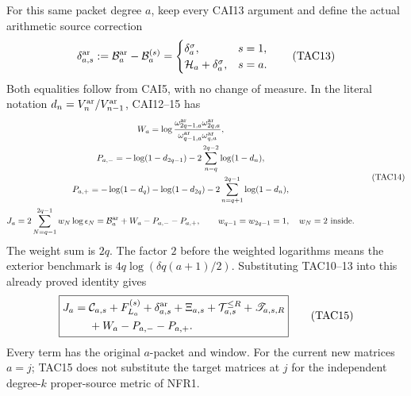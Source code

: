 \documentclass[11pt,a4paper]{article}
\begin{document}
For this same packet degree $a$, keep every CAI13 argument and define
the actual arithmetic source correction
\[
 \delta_{a,s}^{\rm ar}:=\mathcal B_a^{\rm ar}-\mathcal B_a^{(s)}
 =\begin{cases}
     \delta_a^\sigma,&s=1,\\
     \mathcal H_a+\delta_a^\sigma,&s=a.
   \end{cases}
 \tag{TAC13}
\]
Both equalities follow from CAI5, with no change of measure.
In the literal notation $d_n=V_n^{\rm ar}/V_{n-1}^{\rm ar}$,
CAI12--15 has
\[
 \begin{gathered}
 W_a=\log\frac{\omega_{2q-1,a}^{\rm ar}\omega_{2q,a}^{\rm ar}}
                      {\omega_{q-1,a}^{\rm ar}\omega_{q,a}^{\rm ar}},\\
 P_{a,-}=-\log(1-d_{2q-1})-2\sum_{n=q}^{2q-2}\log(1-d_n),\\
 P_{a,+}=-\log(1-d_q)-\log(1-d_{2q})
                          -2\sum_{n=q+1}^{2q-1}\log(1-d_n),\\
 J_a=2\sum_{N=q-1}^{2q-1}w_N\log\epsilon_N
      =\mathcal B_a^{\rm ar}+W_a-P_{a,-}-P_{a,+},\qquad
 w_{q-1}=w_{2q-1}=1,\quad w_N=2\text{ inside}.
 \end{gathered}
 \tag{TAC14}
\]
The weight sum is $2q$.  The factor $2$ before the weighted logarithms
means the exterior benchmark is $4q\log(\delta q(a+1)/2)$.
Substituting TAC10--13 into this already proved identity gives
\[
 \boxed{\begin{split}
 J_a={}&\mathcal C_{a,s}+F_{L_a}^{(s)}
       +\delta_{a,s}^{\rm ar}+\Xi_{a,s}
       +\mathcal T_{a,s}^{\le R}+\mathscr T_{a,s,R}\\
       &+W_a-P_{a,-}-P_{a,+}.
 \end{split}}
 \tag{TAC15}
\]
Every term has the original $a$-packet and window.  For the current
new matrices $a=j$; TAC15 does not substitute the target matrices at
$j$ for the independent degree-$k$ proper-source metric of NFR1.
\end{document}

